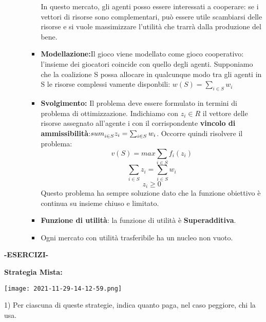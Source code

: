 \documentclass{article}
\theoremstyle{definition}
\theoremstyle{remark}
\begin{document}
\begin{itemize}
\begin{itemize}
\begin{itemize}
            In questo mercato, gli agenti posso essere interessati a cooperare: se i vettori di risorse sono complementari, può essere utile scambiarsi delle risorse e si vuole massimizzare l'utilità che trarrà dalla produzione del bene.
            \item\textbf{Modellazione:}Il gioco viene modellato come gioco cooperativo: l'insieme dei giocatori coincide con quello degli agenti. Supponiamo che la coalizione S possa allocare in qualcunque modo tra gli agenti in S le risorse complessi
            vamente disponbili: \(w(S)=\sum_{i\in S}w_i\)
            \item\textbf{Svolgimento:} Il problema deve essere formulato in termini di problema di ottimizzazione. Indichiamo con \(z_i\in R\) il vettore delle risorse assegnato all'agente i con il corrispondente \textbf{vincolo di ammissibilità}:\(\\sum_{i\in S}^{}z_i=\sum_{i\in S}w_i\).\newline
            Occorre quindi risolvere il problema:
            \begin{equation}
                v(S)=max \sum_{i\in S}f_i(z_i)
            \end{equation}
            \begin{equation}
                \sum_{i\in S}z_i=\sum_{i\in S}w_i
            \end{equation}
            \begin{equation}
                z_i\geq 0
            \end{equation}
            Questo problema ha sempre soluzione dato che la funzione obiettivo è continua su insieme chiuso e limitato.
            \item \textbf{Funzione di utilità}: la funzione di utilità è \textbf{Superadditiva}.
            \item Ogni mercato con utilità trasferibile ha un nucleo non vuoto.
        \end{itemize}
    \end{itemize}
\end{itemize}
\begin{center}
    \textbf{-ESERCIZI-}
\end{center}
\textbf{Strategia Mista:}\newline
\begin{center}
    \texttt{[image: 2021-11-29-14-12-59.png]}
\end{center}
1) Per ciascuna di queste strategie, indica quanto paga, nel caso peggiore, chi la usa.\newline
\begin{table}
    \centering
    \begin{tabular}{|c|c|c|c|c|c|c|c|c|c|c|c|}
        
    \end{tabular}
\end{table}
\end{document}
